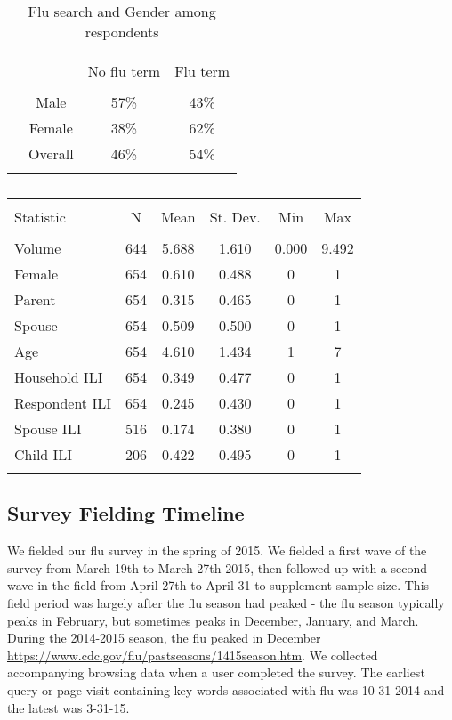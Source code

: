 \documentclass[12pt]{article}
\begin{document}
\begin{table}[!htbp] \centering
  \caption{Flu search and Gender among respondents}
  \label{descript2b}
\begin{tabular}{@{\extracolsep{5pt}} lccc}
\\[-1.8ex]\hline
\hline \\[-1.8ex]
 &  & No flu term & Flu term \\
\hline \\[-1.8ex]
 & Male      & 57\% & 43\% \\
 & Female    & 38\% & 62\% \\
 & Overall   & 46\% & 54\% \\
\hline \\[-1.8ex]
\end{tabular}
\end{table}

\begin{table}[!htbp] \centering
  \caption{}
  \label{tab: Descriptives}
\begin{tabular}{@{\extracolsep{5pt}}lccccc}
\\[-1.8ex]\hline
\hline \\[-1.8ex]
Statistic & \multicolumn{1}{c}{N} & \multicolumn{1}{c}{Mean} & \multicolumn{1}{c}{St. Dev.} & \multicolumn{1}{c}{Min} & \multicolumn{1}{c}{Max} \\
\hline \\[-1.8ex]
Volume & 644 & 5.688 & 1.610 & 0.000 & 9.492 \\
Female & 654 & 0.610 & 0.488 & 0 & 1 \\
Parent & 654 & 0.315 & 0.465 & 0 & 1 \\
Spouse & 654 & 0.509 & 0.500 & 0 & 1 \\
Age & 654 & 4.610 & 1.434 & 1 & 7 \\
Household ILI & 654 & 0.349 & 0.477 & 0 & 1 \\
Respondent ILI & 654 & 0.245 & 0.430 & 0 & 1 \\
Spouse ILI & 516 & 0.174 & 0.380 & 0 & 1 \\
Child ILI & 206 & 0.422 & 0.495 & 0 & 1 \\
\hline \\[-1.8ex]
\end{tabular}
\end{table}

\subsection{Survey Fielding Timeline}
We fielded our flu survey in the spring of 2015. We fielded a first wave of the survey from March 19th to March 27th 2015, then followed up with a second wave in the field from April 27th to April 31 to supplement sample size. This field period was largely after the flu season had peaked - the flu season typically peaks in February, but sometimes peaks in December, January, and March. During the 2014-2015 season, the flu peaked in December \url{https://www.cdc.gov/flu/pastseasons/1415season.htm}. We collected accompanying browsing data when a user completed the survey. The earliest query or page visit containing key words associated with flu was 10-31-2014 and the latest was 3-31-15.
\end{document}
